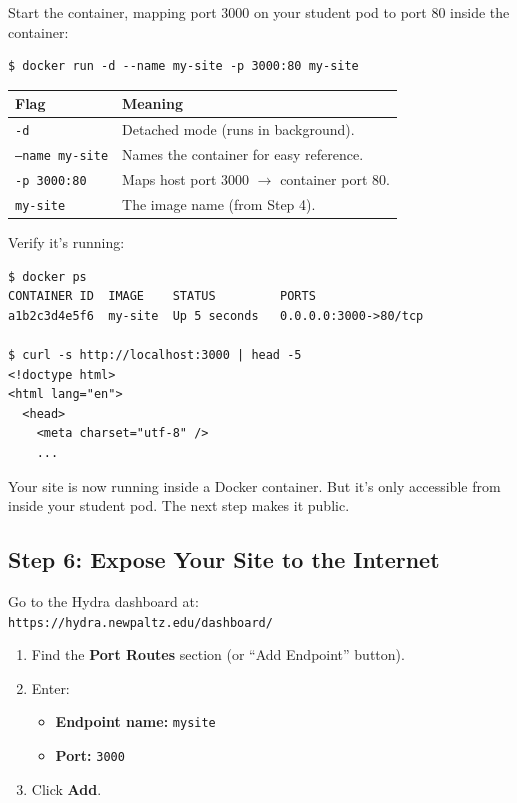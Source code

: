 \documentclass[11pt, letterpaper]{article}
\begin{document}
Start the container, mapping port 3000 on your student pod to port 80 inside
the container:

\begin{lstlisting}[style=terminal]
$ docker run -d --name my-site -p 3000:80 my-site
\end{lstlisting}

\begin{center}
\begin{tabularx}{0.85\textwidth}{lX}
\toprule
\textbf{Flag} & \textbf{Meaning} \\
\midrule
\texttt{-d} & Detached mode (runs in background). \\
\texttt{--name my-site} & Names the container for easy reference. \\
\texttt{-p 3000:80} & Maps host port 3000 $\to$ container port 80. \\
\texttt{my-site} & The image name (from Step 4). \\
\bottomrule
\end{tabularx}
\end{center}

Verify it's running:

\begin{lstlisting}[style=terminal]
$ docker ps
CONTAINER ID  IMAGE    STATUS         PORTS
a1b2c3d4e5f6  my-site  Up 5 seconds   0.0.0.0:3000->80/tcp

$ curl -s http://localhost:3000 | head -5
<!doctype html>
<html lang="en">
  <head>
    <meta charset="utf-8" />
    ...
\end{lstlisting}

Your site is now running inside a Docker container. But it's only accessible
from inside your student pod. The next step makes it public.

\subsection{Step 6: Expose Your Site to the Internet}

Go to the Hydra dashboard at:\\
\texttt{https://hydra.newpaltz.edu/dashboard/}

\begin{enumerate}
  \item Find the \textbf{Port Routes} section (or ``Add Endpoint'' button).
  \item Enter:
  \begin{itemize}[nosep]
    \item \textbf{Endpoint name:} \texttt{mysite}
    \item \textbf{Port:} \texttt{3000}
  \end{itemize}
  \item Click \textbf{Add}.
\end{enumerate}
\end{document}
